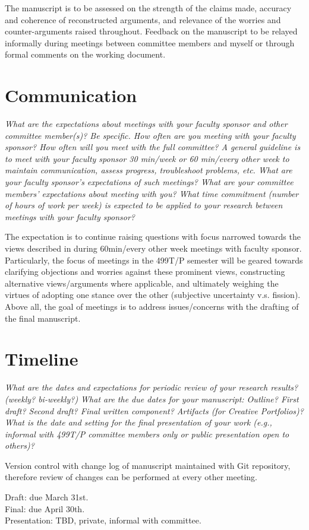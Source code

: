 \documentclass{article}
\begin{document}
\vspace{2em}
\noindent
The manuscript is to be assessed on the strength of the claims made, accuracy and coherence of reconstructed arguments, and relevance of the worries and counter-arguments raised throughout.
Feedback on the manuscript to be relayed informally during meetings between committee members and myself or through formal comments on the working document.  

\section{Communication}
\emph{
What are the expectations about meetings with your faculty sponsor and other committee member(s)? Be specific.
How often are you meeting with your faculty sponsor? How often will you meet with the full committee? A general guideline is to meet with your faculty sponsor 30 min/week or 60 min/every other week to maintain communication, assess progress, troubleshoot problems, etc.
What are your faculty sponsor's expectations of such meetings? What are your committee members’ expectations about meeting with you?
What time commitment (number of hours of work per week) is expected to be applied to your research between meetings with your faculty sponsor?
}

\vspace{2em}
\noindent
The expectation is to continue raising questions with focus narrowed towards the views described in  during 60min/every other week meetings with faculty sponsor. Particularly, the focus of meetings in the 499T/P semester will be geared towards clarifying objections and worries against these prominent views, constructing alternative views/arguments where applicable, and ultimately weighing the virtues of adopting one stance over the other (subjective uncertainty v.s. fission). Above all, the goal of meetings is to address issues/concerns with the drafting of the final manuscript.

\section{Timeline}
\emph{
What are the dates and expectations for periodic review of your research results? (weekly? bi-weekly?)
What are the due dates for your manuscript:
Outline?
First draft?
Second draft?
Final written component?
Artifacts (for Creative Portfolios)?
What is the date and setting for the final presentation of your work (e.g., informal with 499T/P committee members only or public presentation open to others)?
}

\vspace{2em}
\noindent
Version control with change log of manuscript maintained with Git repository, therefore review of changes can be performed at every other meeting.

\vspace{2em}
\noindent
Draft: due March 31st.\\
Final: due April 30th.\\
Presentation: TBD, private, informal with committee.
\end{document}
